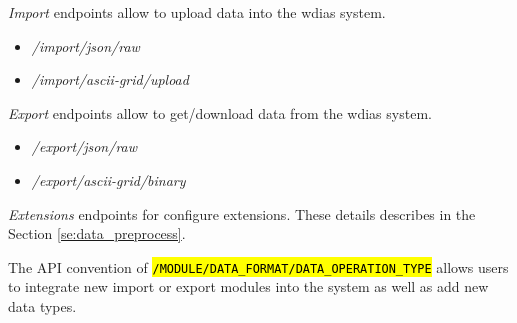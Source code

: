 \emph{Import} endpoints allow to upload data into the \acrshort{wdias} system.
\begin{itemize}
    \item \emph{/import/json/raw}
    \item \emph{/import/ascii-grid/upload}
\end{itemize}

\emph{Export} endpoints allow to get/download data from the \acrshort{wdias} system.
\begin{itemize}
    \item \emph{/export/json/raw}
    \item \emph{/export/ascii-grid/binary}
\end{itemize}

\emph{Extensions} endpoints for configure extensions. These details describes in the Section \ref{se:data_preprocess}.

The API convention of \texttt{\hl{/MODULE/DATA\_FORMAT/DATA\_OPERATION\_TYPE}}  allows users to integrate new import or export modules into the system as well as add new data types.
